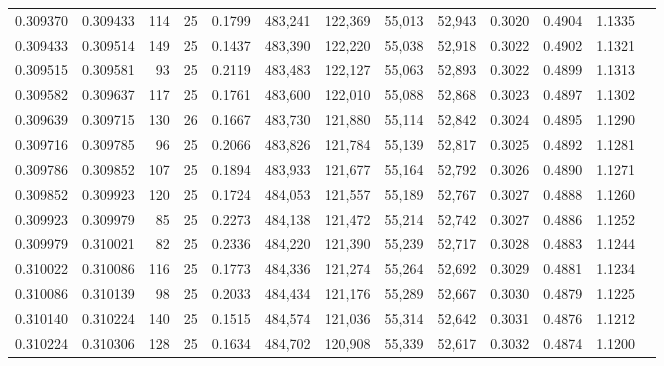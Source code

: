 \begin{tabular}{rrrrrrrrrrrrr}
0.309370 & 0.309433 &   114 &  25 &                                     0.1799 & 483,241 & 122,369 &  55,013 &  52,943 & 0.3020 & 0.4904 & 1.1335 \\
0.309433 & 0.309514 &   149 &  25 &                                     0.1437 & 483,390 & 122,220 &  55,038 &  52,918 & 0.3022 & 0.4902 & 1.1321 \\
0.309515 & 0.309581 &    93 &  25 &                                     0.2119 & 483,483 & 122,127 &  55,063 &  52,893 & 0.3022 & 0.4899 & 1.1313 \\
0.309582 & 0.309637 &   117 &  25 &                                     0.1761 & 483,600 & 122,010 &  55,088 &  52,868 & 0.3023 & 0.4897 & 1.1302 \\
0.309639 & 0.309715 &   130 &  26 &                                     0.1667 & 483,730 & 121,880 &  55,114 &  52,842 & 0.3024 & 0.4895 & 1.1290 \\
0.309716 & 0.309785 &    96 &  25 &                                     0.2066 & 483,826 & 121,784 &  55,139 &  52,817 & 0.3025 & 0.4892 & 1.1281 \\
0.309786 & 0.309852 &   107 &  25 &                                     0.1894 & 483,933 & 121,677 &  55,164 &  52,792 & 0.3026 & 0.4890 & 1.1271 \\
0.309852 & 0.309923 &   120 &  25 &                                     0.1724 & 484,053 & 121,557 &  55,189 &  52,767 & 0.3027 & 0.4888 & 1.1260 \\
0.309923 & 0.309979 &    85 &  25 &                                     0.2273 & 484,138 & 121,472 &  55,214 &  52,742 & 0.3027 & 0.4886 & 1.1252 \\
0.309979 & 0.310021 &    82 &  25 &                                     0.2336 & 484,220 & 121,390 &  55,239 &  52,717 & 0.3028 & 0.4883 & 1.1244 \\
0.310022 & 0.310086 &   116 &  25 &                                     0.1773 & 484,336 & 121,274 &  55,264 &  52,692 & 0.3029 & 0.4881 & 1.1234 \\
0.310086 & 0.310139 &    98 &  25 &                                     0.2033 & 484,434 & 121,176 &  55,289 &  52,667 & 0.3030 & 0.4879 & 1.1225 \\
0.310140 & 0.310224 &   140 &  25 &                                     0.1515 & 484,574 & 121,036 &  55,314 &  52,642 & 0.3031 & 0.4876 & 1.1212 \\
0.310224 & 0.310306 &   128 &  25 &                                     0.1634 & 484,702 & 120,908 &  55,339 &  52,617 & 0.3032 & 0.4874 & 1.1200 \\

\end{tabular}
